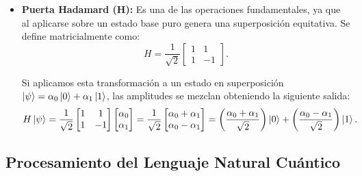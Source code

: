 \begin{itemize}
          Matemáticamente, al operar sobre un qubit genérico $\ket{\psi} = \alpha_0\ket{0} + \alpha_1\ket{1}$, altera exclusivamente el signo de la segunda amplitud:
          \[
              Z\ket{\psi} = \begin{bmatrix} 1 & 0 \\ 0 & -1 \end{bmatrix} \begin{bmatrix} \alpha_0 \\ \alpha_1 \end{bmatrix} = \begin{bmatrix} \alpha_0 \\ -\alpha_1 \end{bmatrix} = \alpha_0\ket{0} - \alpha_1\ket{1}.
          \]

    \item \textbf{Puerta Hadamard (H):} Es una de las operaciones fundamentales, ya que al aplicarse sobre un estado base puro genera una superposición equitativa. Se define matricialmente como:
          \[
              H = \frac{1}{\sqrt{2}}\begin{bmatrix}
                  1 & 1  \\
                  1 & -1
              \end{bmatrix}.
          \]

          Si aplicamos esta transformación a un estado en superposición $\ket{\psi} = \alpha_0\ket{0} + \alpha_1\ket{1}$, las amplitudes se mezclan obteniendo la siguiente salida:
          \[
              H\ket{\psi} = \frac{1}{\sqrt{2}}\begin{bmatrix} 1 & 1 \\ 1 & -1 \end{bmatrix} \begin{bmatrix} \alpha_0 \\ \alpha_1 \end{bmatrix} = \frac{1}{\sqrt{2}}\begin{bmatrix} \alpha_0 + \alpha_1 \\ \alpha_0 - \alpha_1 \end{bmatrix} = \left(\frac{\alpha_0 + \alpha_1}{\sqrt{2}}\right)\ket{0} + \left(\frac{\alpha_0 - \alpha_1}{\sqrt{2}}\right)\ket{1}.
          \]
\end{itemize}


\subsection{Procesamiento del Lenguaje Natural Cuántico}
\label{chap:plnc}

